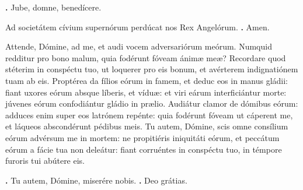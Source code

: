 \begin{small}
\textbf{\Vbar.} Jube, domne, benedícere.

Ad societátem cívium supernórum perdúcat nos Rex Angelórum. \textbf{\Rbar.} Amen.
\end{small}


Attende, Dómine, ad me, et audi vocem adversariórum meórum.
Numquid redditur pro bono malum, quia fodérunt fóveam ánimæ meæ? Recordare quod stéterim in conspéctu tuo, ut loquerer pro eis bonum, et avérterem indignatiónem tuam ab eis.
Proptérea da fílios eórum in famem, et deduc eos in manus gládii: fiant uxores eórum absque líberis, et víduæ: et viri eárum interficiántur morte: júvenes eórum confodiántur gládio in prælio.
Audiátur clamor de dómibus eórum: adduces enim super eos latrónem repénte: quia fodérunt fóveam ut cáperent me, et láqueos abscondérunt pédibus meis.
Tu autem, Dómine, scis omne consílium eórum advérsum me in mortem: ne propitiéris iniquitáti eórum, et peccátum eórum a fácie tua non deleátur: fiant corruéntes in conspéctu tuo, in témpore furoris tui abútere eis.

\textbf{\Vbar.} Tu autem, Dómine, miserére nobis.
\textbf{\Rbar.} Deo grátias.

